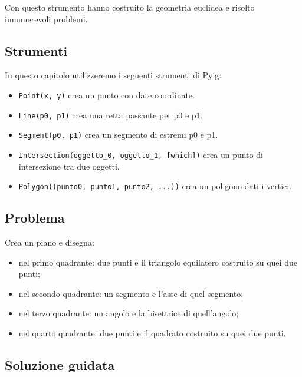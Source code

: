 Con questo strumento hanno costruito la geometria euclidea e risolto
innumerevoli problemi.

\subsection{Strumenti}

In questo capitolo utilizzeremo i seguenti strumenti di Pyig:

\begin{itemize} [noitemsep]
\item \texttt{Point(x, y)} crea un punto con date coordinate.
\item \texttt{Line(p0, p1)} crea una retta passante per p0 e p1.
\item \texttt{Segment(p0, p1)} crea un segmento di estremi p0 e p1.
\item \texttt{Intersection(oggetto\_0, oggetto\_1, {[}which{]})} crea un 
punto di intersezione tra due oggetti.
\item \texttt{Polygon((punto0, punto1, punto2, ...))} crea un poligono dati 
i vertici.
\end{itemize}

\subsection{Problema}

Crea un piano e disegna:
\begin{itemize} [noitemsep]
\item nel primo quadrante: 
 due punti e il triangolo equilatero costruito su quei due punti;
\item nel secondo quadrante: 
 un segmento e l'asse di quel segmento;
\item nel terzo quadrante: 
 un angolo e la bisettrice di quell'angolo;
\item nel quarto quadrante: 
 due punti e il quadrato costruito su quei due punti.
\end{itemize}

\subsection{Soluzione guidata}


